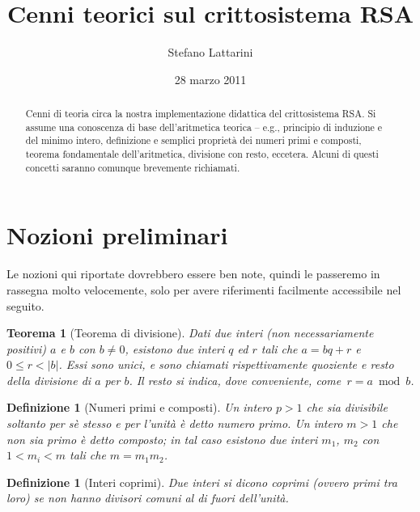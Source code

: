 \documentclass[pdflatex,11pt,a4paper,oneside]{article}
\newcommand{\theauthor}[0]{Stefano Lattarini}
\newcommand{\thetitle}[0]{Cenni teorici sul crittosistema RSA}
\newcommand{\TFA}{teorema fondamentale dell'aritmetica}
\let\OldEmph\emph
\renewcommand{\emph}[1]{\OldEmph{#1\/}}
\newcommand{\abs}[1]{\left|{#1}\right|}
\newcommand{\mmodop}[0]{\ensuremath{\operatorname{mod}}}
\newcommand{\rem}[2]{\ensuremath{{#1}\:\mmodop\:{#2}}}
\newtheorem{theorem}[TheoremLike]{Teorema}
\newtheorem{definition}[TheoremLike]{Definizione}
\begin{document}
\title{\thetitle}
\author{\theauthor}
\date{28 marzo 2011}

\maketitle


\begin{abstract}
  Cenni di teoria circa la nostra implementazione didattica del
  crittosistema RSA.  Si assume una conoscenza di base dell'aritmetica
  teorica -- e.g., principio di induzione e del minimo intero, definizione
  e semplici propriet\`a dei numeri primi e composti, \TFA, divisione con
  resto, eccetera.  Alcuni di questi concetti saranno comunque brevemente
  richiamati.
\end{abstract}


\section{Nozioni preliminari}

Le nozioni qui riportate dovrebbero essere ben note, quindi le
passeremo in rassegna molto velocemente, solo per avere riferimenti
facilmente accessibile nel seguito.

\begin{theorem}[Teorema di divisione]
Dati due interi (non necessariamente positivi) $a$ e $b$ con $b \neq 0$,
esistono due interi $q$ ed $r$ tali che $a = bq + r$ e $0 \leq r
< \abs{b}$. Essi sono unici, e sono chiamati rispettivamente
\emph{quoziente} e \emph{resto} della divisione di $a$ per $b$.
Il resto si indica, dove conveniente, come \,$r = \rem{a}{b}$.
\end{theorem}

\begin{definition}[Numeri primi e composti]
Un intero $p > 1$ che sia divisibile soltanto per s\`e stesso e per
l'unit\`a \`e detto \emph{numero primo}.  Un intero $m > 1$ che non
sia primo \`e detto \emph{composto}; in tal caso esistono due interi
$m_1$, $m_2$ con $1 < m_i < m$ tali che $m = m_1 m_2$.
\end{definition}

\begin{definition}[Interi coprimi]
Due interi si dicono \emph{coprimi} (ovvero \emph{primi tra loro}) se
non hanno divisori comuni al di fuori dell'unit\`a.
\end{definition}
\end{document}
